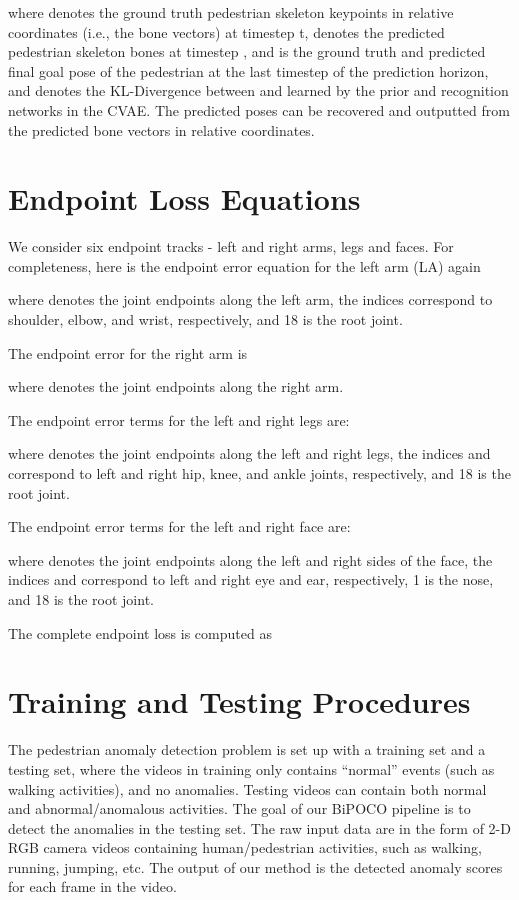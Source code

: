 \documentclass[nohyperref]{article}
\theoremstyle{plain}
\theoremstyle{definition}
\theoremstyle{remark}
\begin{document}
where  denotes the ground truth pedestrian skeleton keypoints in relative coordinates (i.e., the bone vectors) at timestep t,   denotes the predicted pedestrian skeleton bones at timestep ,  and  is the ground truth and predicted final goal pose of the pedestrian at the last timestep of the prediction horizon, and  denotes the KL-Divergence between  and  learned by the prior and recognition networks in the CVAE. The predicted poses can be recovered and outputted from the  predicted bone vectors in relative coordinates.



\section{Endpoint Loss Equations}
\label{appendix:endpoint_loss_equations}



We consider six endpoint tracks - left and right arms, legs and faces. For completeness, here is the endpoint error equation for the left arm (LA) again

where  denotes the joint endpoints along the left arm, the indices  correspond to shoulder, elbow, and wrist, respectively, and 18 is the root joint. 

The endpoint error for the right arm is

where  denotes the joint endpoints along the right arm.

The endpoint error terms for the left and right legs are:


where  denotes the joint endpoints along the left and right legs, the indices   and  correspond to left and right hip, knee, and ankle joints, respectively, and 18 is the root joint. 


The endpoint error terms for the left and right face are:


where  denotes the joint endpoints along the left and right sides of the face, the indices   and  correspond to left and right eye and ear, respectively, 1 is the nose, and 18 is the root joint. 

The complete endpoint loss is computed as 







\section{Training and Testing Procedures}
The pedestrian anomaly detection problem is set up with a training set and a testing set, where the videos in training only contains ``normal'' events (such as walking activities), and no anomalies. Testing videos can contain both normal and abnormal/anomalous activities. The goal of our BiPOCO pipeline is to detect the anomalies in the testing set. The raw input data are in the form of 2-D RGB camera videos containing human/pedestrian activities, such as walking, running, jumping, etc. The output of our method is the detected anomaly scores for each frame in the video. 
\end{document}
